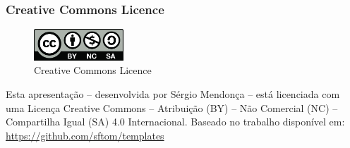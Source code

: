 \documentclass[presentation]{beamer}
\begin{document}
 \begin{frame}[c]\frametitle{Creative Commons Licence}
     \begin{figure}[ht]
          \centering
          \caption{\label{fig:by-nc-sa} Creative Commons Licence}
          \includegraphics[width=0.3\textwidth]{./img/by-nc-sa.jpg}
      \end{figure} 
      Esta apresentação -- desenvolvida por Sérgio Mendonça -- está licenciada com uma Licença Creative Commons -- Atribuição (BY) -- Não Comercial (NC) -- Compartilha Igual (SA) 4.0 Internacional. Baseado no trabalho disponível em:\newline 
      \url{https://github.com/sftom/templates}
 \end{frame}
\end{document}

